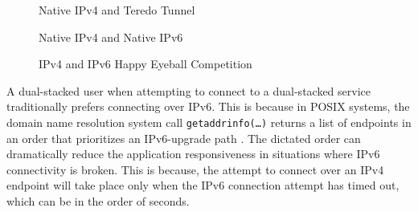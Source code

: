 \begin{figure}[t]
  \begin{minipage}[t]{0.50\textwidth}
    \centering
    \caption{Native IPv4 and Teredo Tunnel}
  \end{minipage}
  \begin{minipage}[t]{0.50\textwidth}
    \centering
    \caption{Native IPv4 and Native IPv6}
  \end{minipage}
\caption{\label{fig:happy-v4-v6-compete}IPv4 and IPv6 Happy Eyeball Competition} 
\end{figure}

A dual-stacked user when attempting to connect to a dual-stacked service
traditionally prefers connecting over IPv6. This is because in POSIX systems,
the domain name resolution system call \texttt{getaddrinfo(\ldots)} returns a
list of endpoints in an order that prioritizes an IPv6-upgrade path
\cite{rfc6724}. The dictated order can dramatically reduce the application
responsiveness in situations where IPv6 connectivity is broken. This is
because, the attempt to connect over an IPv4 endpoint will take place only
when the IPv6 connection attempt has timed out, which can be in the order of
seconds.

